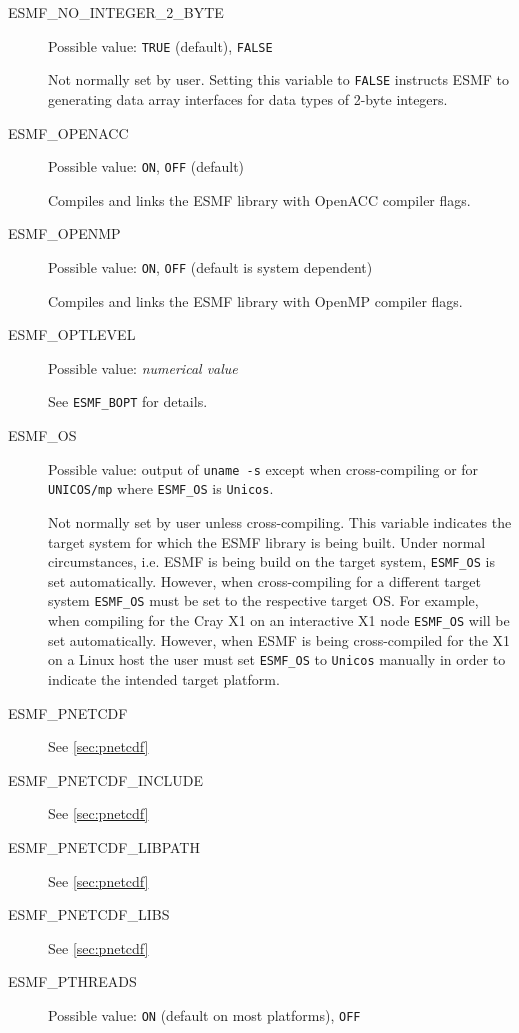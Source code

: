 \begin{description}
\item[ESMF\_NO\_INTEGER\_2\_BYTE] 
Possible value: {\tt TRUE} (default), {\tt FALSE}

Not normally set by user. Setting this variable to {\tt FALSE} instructs
ESMF to generating data array interfaces for data types of 2-byte integers.

\item[ESMF\_OPENACC] 
Possible value: {\tt ON}, {\tt OFF} (default)

Compiles and links the ESMF library with OpenACC compiler flags.

\item[ESMF\_OPENMP] 
Possible value: {\tt ON}, {\tt OFF} (default is system dependent)

Compiles and links the ESMF library with OpenMP compiler flags.

\item[ESMF\_OPTLEVEL] 
Possible value: {\em numerical value}

See {\tt ESMF\_BOPT} for details.

\item[ESMF\_OS]
Possible value: output of {\tt uname -s} except when cross-compiling or for
{\tt UNICOS/mp} where {\tt ESMF\_OS} is {\tt Unicos}.

Not normally set by user unless cross-compiling. This variable indicates the
target system for which the ESMF library is being built. Under normal
circumstances, i.e. ESMF is being build on the target system, {\tt ESMF\_OS} is
set automatically. However, when cross-compiling for a different target system
{\tt ESMF\_OS} must be set to the respective target OS. For example, when
compiling for the Cray X1 on an interactive X1 node {\tt ESMF\_OS} will be set
automatically. However, when ESMF is being cross-compiled for the X1 on a Linux
host the user must set {\tt ESMF\_OS} to {\tt Unicos} manually in order to
indicate the intended target platform.

\item[ESMF\_PNETCDF]
See \ref{sec:pnetcdf}

\item[ESMF\_PNETCDF\_INCLUDE]
See \ref{sec:pnetcdf}

\item[ESMF\_PNETCDF\_LIBPATH]
See \ref{sec:pnetcdf}

\item[ESMF\_PNETCDF\_LIBS]
See \ref{sec:pnetcdf}

\item[ESMF\_PTHREADS]
Possible value: {\tt ON} (default on most platforms), {\tt OFF}


\end{description}
